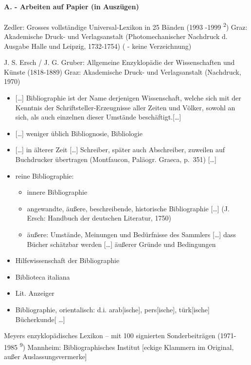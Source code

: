 \documentclass[a4paper,
fontsize=11pt,
oneside,
numbers=noperiodatend,
parskip=half-,
bibliography=totoc,
final
]{scrartcl}
\begin{document}
\paragraph{A. - Arbeiten auf Papier (in
Auszügen)}\label{a.---arbeiten-auf-papier-in-auszuxfcgen}

Zedler: Grosses vollständige Universal-Lexikon in 25 Bänden (1993 -1999
\textsuperscript{2}) Graz: Akademische Druck- und Verlagsanstalt
(Photomechanischer Nachdruck d. Ausgabe Halle und Leipzig, 1732-1754) (
- keine Verzeichnung)

J. S. Ersch / J. G. Gruber: Allgemeine Enzyklopädie der Wissenschaften
und Künste (1818-1889) Graz: Akademische Druck- und Verlagsanstalt
(Nachdruck, 1970)

\begin{itemize}
\item
  {[}\ldots{}{]} Bibliographie ist der Name derjenigen Wissenschaft,
  welche sich mit der Kenntnis der Schriftsteller-Erzeugnisse aller
  Zeiten und Völker, sowohl an sich, als auch einzelnen dieser Umstände
  beschäftigt.{[}\ldots{}{]}
\item
  {[}\ldots{}{]} weniger üblich Bibliognosie, Bibliologie
\item
  {[}\ldots{}{]} in älterer Zeit {[}\ldots{}{]} Schreiber, später auch
  Abschreiber, zuweilen auf Buchdrucker übertragen (Montfaucon, Paläogr.
  Graeca, p.~351) {[}\ldots{}{]}
\item
  reine Bibliographie:

  \begin{itemize}
  \item
    innere Bibliographie
  \item
    angewandte, äußere, beschreibende, historische Bibliographie
    {[}\ldots{}{]} (J. Ersch: Handbuch der deutschen Literatur, 1750)
  \item
    äußere: Umstände, Meinungen und Bedürfnisse des Sammlers
    {[}\ldots{}{]} dass Bücher schätzbar werden {[}\ldots{}{]} äußerer
    Gründe und Bedingungen
  \end{itemize}
\item
  Hilfswissenschaft der Bibliographie
\item
  Biblioteca italiana
\item
  Lit. Anzeiger
\item
  Bibliographie, orientalisch: d.i. arab{[}ische{]}, pers{[}ische{]},
  türk{[}ische{]} Bücherkunde{[} \ldots{}{]}
\end{itemize}

Meyers enzyklopädisches Lexikon -- mit 100 signierten Sonderbeiträgen
(1971-1985 \textsuperscript{9}) Mannheim: Bibliographisches Institut
{[}eckige Klammern im Original, außer Auslassungsvermerke{]}
\end{document}
